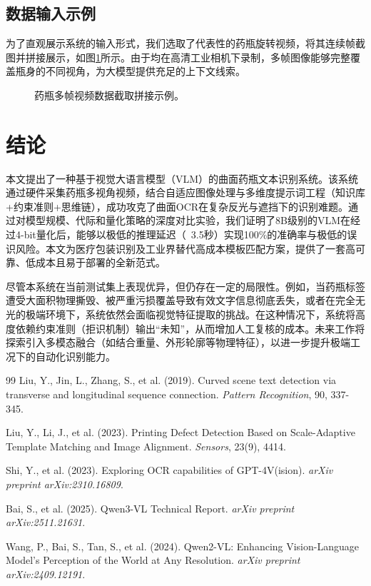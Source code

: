 \documentclass[11pt,a4paper]{ctexart}
\begin{document}
\subsection{数据输入示例}
为了直观展示系统的输入形式，我们选取了代表性的药瓶旋转视频，将其连续帧截图并拼接展示，如图\ref{fig:frames}所示。由于均在高清工业相机下录制，多帧图像能够完整覆盖瓶身的不同视角，为大模型提供充足的上下文线索。

\begin{figure}[h]
\centering
\vspace{5cm} %
\caption{药瓶多帧视频数据截取拼接示例。}
\label{fig:frames}
\end{figure}

\section{结论}
本文提出了一种基于视觉大语言模型（VLM）的曲面药瓶文本识别系统。该系统通过硬件采集药瓶多视角视频，结合自适应图像处理与多维度提示词工程（知识库+约束准则+思维链），成功攻克了曲面OCR在复杂反光与遮挡下的识别难题。通过对模型规模、代际和量化策略的深度对比实验，我们证明了8B级别的VLM在经过4-bit量化后，能够以极低的推理延迟（~3.5秒）实现100\%的准确率与极低的误识风险。本文为医疗包装识别及工业界替代高成本模板匹配方案，提供了一套高可靠、低成本且易于部署的全新范式。

尽管本系统在当前测试集上表现优异，但仍存在一定的局限性。例如，当药瓶标签遭受大面积物理撕毁、被严重污损覆盖导致有效文字信息彻底丢失，或者在完全无光的极端环境下，系统依然会面临视觉特征提取的挑战。在这种情况下，系统将高度依赖约束准则（拒识机制）输出“未知”，从而增加人工复核的成本。未来工作将探索引入多模态融合（如结合重量、外形轮廓等物理特征），以进一步提升极端工况下的自动化识别能力。

\begin{thebibliography}{99}
Liu, Y., Jin, L., Zhang, S., et al. (2019). Curved scene text detection via transverse and longitudinal sequence connection. \textit{Pattern Recognition}, 90, 337-345.

Liu, Y., Li, J., et al. (2023). Printing Defect Detection Based on Scale-Adaptive Template Matching and Image Alignment. \textit{Sensors}, 23(9), 4414.

Shi, Y., et al. (2023). Exploring OCR capabilities of GPT-4V(ision). \textit{arXiv preprint arXiv:2310.16809}.

Bai, S., et al. (2025). Qwen3-VL Technical Report. \textit{arXiv preprint arXiv:2511.21631}.

Wang, P., Bai, S., Tan, S., et al. (2024). Qwen2-VL: Enhancing Vision-Language Model's Perception of the World at Any Resolution. \textit{arXiv preprint arXiv:2409.12191}.

\end{thebibliography}
\end{document}
